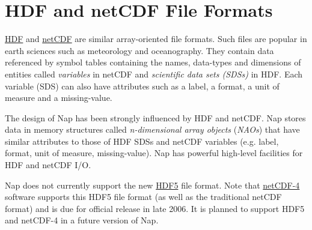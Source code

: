 
\section{HDF and netCDF File Formats} 
    \label{hdf-netcdf}

  \href{http://hdf.ncsa.uiuc.edu}{HDF} and 
  \href{http://www.unidata.ucar.edu/packages/netcdf/index.html}{netCDF}
  are similar array-oriented file formats.
Such files are popular in earth sciences such as meteorology and oceanography.
They contain data referenced by
symbol tables containing the names, data-types and dimensions of entities called
\emph{variables} in netCDF and \emph{scientific data sets (SDSs)} in HDF.
Each variable (SDS) can also have attributes such as a label, a
  format, a unit of measure and a missing-value. 

The design of Nap has been strongly influenced by HDF and netCDF.
Nap stores data in memory structures called \emph{n-dimensional array objects} (\emph{NAOs})
that have similar attributes to those of HDF SDSs and netCDF variables
(e.g. label, format, unit of measure, missing-value). 
Nap has powerful high-level facilities for HDF and netCDF I/O.

Nap does not currently support the new 
\href{http://hdf.ncsa.uiuc.edu/whatishdf5.html}{HDF5}
file format.
Note that
\href{http://www.unidata.ucar.edu/software/netcdf/netcdf-4/}{netCDF-4} software
supports this HDF5 file format (as well as the traditional netCDF format)
and is due for official release in late 2006.
It is planned to support HDF5 and netCDF-4 in a future version of Nap.
